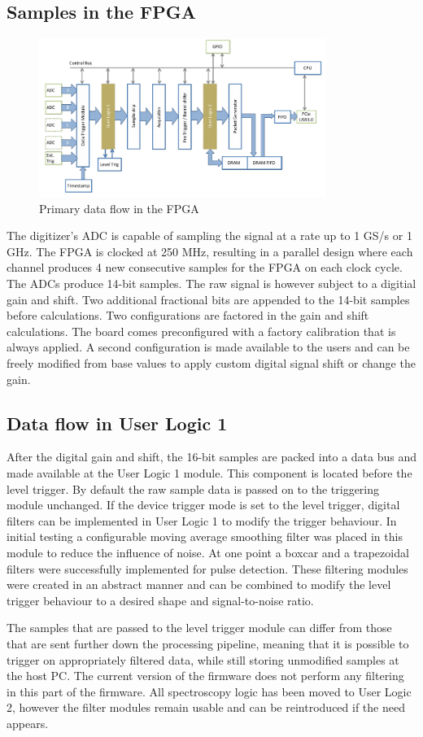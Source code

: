 \documentclass[12pt]{article}
\begin{document}
	\subsection{Samples in the FPGA}
		\begin{figure}[!h]
			\centering
			\includegraphics[width=0.83\textwidth]{img/devkit_dataflow.png}
			\caption{Primary data flow in the FPGA}\label{fig:devkit_dataflow}
		\end{figure}
		The digitizer's ADC is capable of sampling the signal at a rate up to 1 GS/s or 1 GHz.
		The FPGA is clocked at 250 MHz, resulting in a parallel design where each channel produces
		4 new consecutive samples for the FPGA on each clock cycle. The ADCs produce 14-bit samples.
		The raw signal is however subject to a digitial gain and shift.
		Two additional fractional bits are appended to the 14-bit samples before calculations.
		Two configurations are factored in the gain and shift calculations. The board comes preconfigured
		with a factory calibration that is always applied. A second configuration is made available to
		the users and can be freely modified from base values to apply custom digital signal shift or change the gain.
	\subsection{Data flow in User Logic 1}
		After the digital gain and shift, the 16-bit samples are packed into a data bus and made available at
		the User Logic 1 module. This component is located before the level trigger. By default the raw sample data
		is passed on to the triggering module unchanged. If the device trigger mode is set to the level trigger,
		digital filters can be implemented in User Logic 1 to modify the trigger behaviour. In initial testing
		a configurable moving average smoothing filter was placed in this module to reduce the influence of noise.
		At one point a boxcar and a trapezoidal filters were successfully implemented for pulse detection.
		These filtering modules were created in an abstract manner and can be combined to modify the level trigger
		behaviour to a desired shape and signal-to-noise ratio.
		\par
		The samples that are passed to the level trigger module can differ from those that are sent further
		down the processing pipeline, meaning that it is possible to trigger on appropriately filtered data,
		while still storing unmodified samples at the host PC. The current version of the firmware does not
		perform any filtering in this part of the firmware. All spectroscopy logic has been moved to User Logic 2,
		however the filter modules remain usable and can be reintroduced if the need appears.
\end{document}
